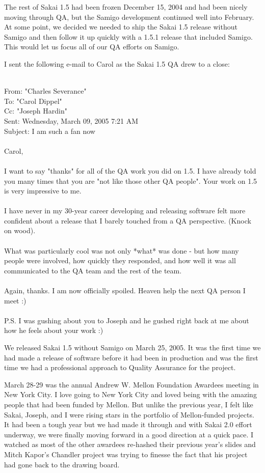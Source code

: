\documentclass[12pt]{book}
\begin{document}
The rest of Sakai 1.5 had been frozen December 15, 2004
and had been nicely moving through QA, but the Samigo
development continued well into February.   At some point,
we decided we needed to ship the Sakai 1.5 release
without Samigo and then follow it up quickly with a
1.5.1 release that included Samigo.   This would let us
focus all of our QA efforts on Samigo.

I sent the following e-mail to Carol as the Sakai 1.5
QA drew to a close:\\
\\
\begin{sf}
From: "Charles Severance"\\
To: "Carol Dippel"\\
Cc: "Joseph Hardin"\\
Sent: Wednesday, March 09, 2005 7:21 AM\\
Subject: I am such a fan now\\
\\
Carol,\\
\\
I want to say "thanks" for all of the QA work you did
on 1.5.  I have already told you many times that you
are "not like those other QA people". Your work
on 1.5 is very impressive to me.\\
\\
I have never in my 30-year career developing and
releasing software felt more confident about a
release that I barely touched from a QA perspective.
(Knock on wood).\\
\\
What was particularly cool was not only *what* was
done - but how many people were involved, how
quickly they responded, and how well it was
all communicated to the QA team and the rest
of the team.\\
\\
Again, thanks. I am now officially spoiled.  Heaven
help the next QA person I meet :)\\
\\
P.S.  I was gushing about you to Joseph and he gushed
right back at me about how he feels about your work :)\\
\end{sf}

We released Sakai 1.5 without Samigo on March 25, 2005.
It was the first time we had made a release of software
before it had been in production and was the first time
we had a professional approach to Quality Assurance
for the project.

March 28-29 was the annual Andrew W. Mellon Foundation
Awardees meeting in New York City.  I love going to New York
City and loved being with the amazing people that had been
funded by Mellon.  But unlike the previous year, I felt
like Sakai, Joseph, and I were rising stars in the
portfolio of Mellon-funded projects.  It had been a tough year
but we had made it through and with Sakai 2.0 effort underway,
we were finally moving forward in a good direction
at a quick pace.  I watched
as most of the other awardees re-hashed their previous year's
slides and Mitch Kapor's Chandler project
was trying to finesse the fact that his project had
gone back to the drawing board.
\end{document}
